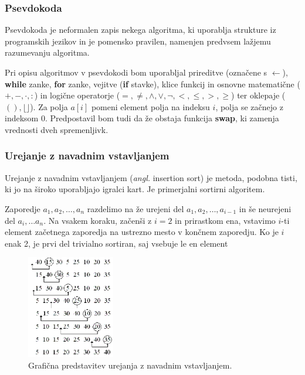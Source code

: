 \documentclass[a4paper,oneside]{article}
\begin{document}
\subsubsection{Psevdokoda}
Psevdokoda je neformalen zapis nekega algoritma, ki uporablja strukture iz programskih
jezikov in je pomensko pravilen, namenjen predvsem lažjemu razumevanju algoritma.

Pri opisu algoritmov v psevdokodi bom uporabljal prireditve (označene s $\gets$), 
\textbf{while} zanke, \textbf{for} zanke, vejitve (\textbf{if} stavke), klice 
funkcij in osnovne  matematične ($+, -, \cdot, :$) in logične operatorje ($=, 
\neq, \wedge, \vee, \neg, <, \leq, >, \geq$) ter oklepaje ($(), \lfloor\rfloor$). 
Za polja $a[i]$ pomeni element polja na indeksu $i$, polja se začnejo z indeksom $0$.
Predpostavil bom tudi da že obstaja funkcija \textbf{swap}, ki zamenja vrednosti dveh
spremenljivk.

\subsubsection{Urejanje z navadnim vstavljanjem}
\label{chapter:insertionsort}
Urejanje z navadnim vstavljanjem (\emph{angl.} insertion sort) je metoda,
podobna tisti, ki jo na široko uporabljajo igralci kart. Je primerjalni sortirni algoritem.

Zaporedje $a_1, a_2, \ldots, a_n$ razdelimo na že urejeni del $a_1, a_2, \ldots, a_{i-1}$
in še neurejeni del $a_i, \ldots a_n$. Na vsakem koraku, začenši z $i = 2$ in
prirastkom ena, vstavimo $i$-ti element začetnega zaporedja na ustrezno mesto v končnem
zaporedju. Ko je $i$ enak 2, je prvi del trivialno sortiran, saj vsebuje le en element

\begin{figure}[h]
    \begin{center}
        \includegraphics[height=45mm]{slike/insertionsort.png}
    \end{center}
    \vspace{-0.7cm}
    \caption{Grafična predstavitev urejanja z navadnim vstavljanjem.}
    \label{fig:insertionsortimage}
\end{figure}
\end{document}
